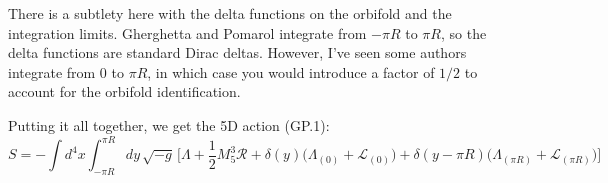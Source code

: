 \documentclass[11pt]{article}
\begin{document}
\begin{notationbox}
There is a subtlety here with the delta functions on the orbifold and the integration limits. Gherghetta and Pomarol integrate from $-\pi R$ to $\pi R$, so the delta functions are standard Dirac deltas. However, I've seen some authors integrate from $0$ to $\pi R$, in which case you would introduce a factor of $1/2$ to account for the orbifold identification.
\end{notationbox}

Putting it all together, we get the 5D action (GP.1):
\begin{equation}
S
= -\int d^{4}x \int_{-\pi R}^{\pi R} dy \,\sqrt{-g}\,
\Big[
\Lambda + \frac{1}{2} M_5^{3} \mathcal{R}
+ \delta(y)\big(\Lambda_{(0)}+\mathcal{L}_{(0)}\big)
+ \delta(y-\pi R)\big(\Lambda_{(\pi R)}+\mathcal{L}_{(\pi R)}\big)
\Big]
\end{equation}
\end{document}
